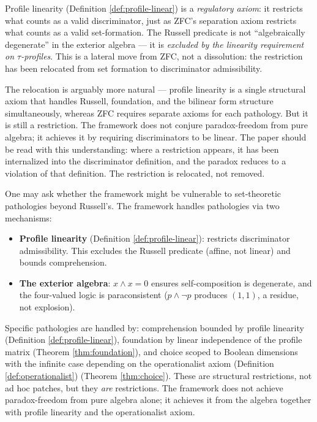 \begin{remark}
Profile linearity (Definition \ref{def:profile-linear}) is a \emph{regulatory axiom}: it
restricts what counts as a valid discriminator, just as
ZFC's separation axiom restricts what counts as a valid
set-formation. The Russell predicate is not
``algebraically degenerate'' in the exterior algebra ---
it is \emph{excluded by the linearity requirement on
$\tau$-profiles}. This is a lateral move from ZFC, not a
dissolution: the restriction has been relocated from set
formation to discriminator admissibility.

The relocation is arguably more natural --- profile
linearity is a single structural axiom that handles
Russell, foundation, and the bilinear form structure
simultaneously, whereas ZFC requires separate axioms for
each pathology. But it is still a restriction. The
framework does not conjure paradox-freedom from pure
algebra; it achieves it by requiring discriminators to be
linear. The paper should be read with this understanding:
where a restriction appears, it has been
internalized into the discriminator definition,
and the paradox reduces to a violation of that definition.
The restriction is relocated, not removed.
\end{remark}

\begin{remark}
One may ask whether the framework might be vulnerable to
set-theoretic pathologies beyond Russell's. The framework
handles pathologies via two mechanisms:
\begin{itemize}[nosep]
  \item \textbf{Profile linearity}
    (Definition \ref{def:profile-linear}): restricts
    discriminator admissibility. This excludes the Russell
    predicate (affine, not linear) and bounds comprehension.
  \item \textbf{The exterior algebra}: $x \wedge x = 0$
    ensures self-composition is degenerate, and the
    four-valued logic is paraconsistent ($p \wedge \neg p$
    produces $(1,1)$, a residue, not explosion).
\end{itemize}
Specific pathologies are handled by: comprehension
bounded by profile linearity (Definition \ref{def:profile-linear}), foundation by
linear independence of the profile matrix
(Theorem \ref{thm:foundation}), and choice scoped to
Boolean dimensions with the infinite case depending on
the operationalist axiom (Definition \ref{def:operationalist}) (Theorem \ref{thm:choice}).
These are structural restrictions, not ad hoc patches,
but they \emph{are} restrictions. The framework does not
achieve paradox-freedom from pure algebra alone; it
achieves it from the algebra together with profile
linearity and the operationalist axiom.
\end{remark}

